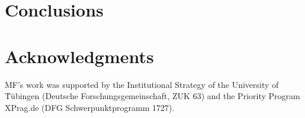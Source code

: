 \documentclass[10pt,letterpaper]{article}
\begin{document}
\section{Conclusions}


\section{Acknowledgments}

MF's work was supported by the Institutional Strategy of the University of T̈\"{u}bingen (Deutsche
Forschungsgemeinschaft, ZUK 63) and the Priority Program XPrag.de (DFG Schwerpunktprogramm
1727). 





\setlength{\bibleftmargin}{.125in}
\setlength{\bibindent}{-\bibleftmargin}


\end{document}
